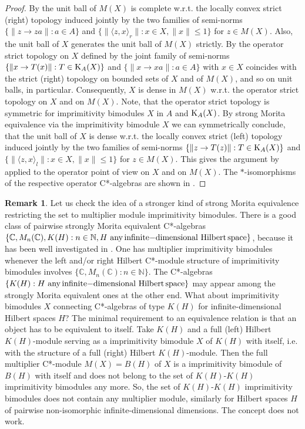 \documentclass{amsart}
\theoremstyle{definition}
\newtheorem{rmk}[thm]{Remark}
\begin{document}
\begin{proof}
By  \cite[Thm.~1.8, 1.9]{BG_2004} the unit ball of $M(X)$ is complete w.r.t. the locally convex strict (right) topology induced jointly by the two families of semi-norms $\{ \| z \to za \|: a \in A \}$ and $\{ \| \langle z,x \rangle_r \|: x \in X, \|x\| \leq 1 \}$ for $z \in M(X)$. Also, the unit ball of $X$ generates the unit ball of $M(X)$ strictly. By \cite[Def.~2, Remark 3]{B_2004} the operator strict topology on $X$ defined by the joint family of semi-norms $\{\| x \to T(x) \| :  T \in {\rm K}_A(X)\}$ and $\{ \|  x \to xa \|: a \in A \}$ with $x \in X$ coincides with the strict (right) topology on bounded sets of $X$ and of $M(X)$, and so on unit balls, in particular. Consequently, $X$ is dense in $M(X)$ w.r.t. the operator strict topology on $X$ and on $M(X)$. Note, that the operator strict topology is symmetric for imprimitivity bimodules $X$ in $A$ and ${\rm K}_A(X)$. 
By strong Morita equivalence via the imprimitivity bimodule $X$ we can symmetrically conclude, that the unit ball of $X$ is dense w.r.t. the locally convex strict (left) topology induced jointly by the two families of semi-norms $\{ \| z \to T(z) \|: T \in {\rm K}_A(X) \}$ and $\{ \| \langle z,x \rangle_l \|: x \in X, \|x\| \leq 1 \}$ for $z \in M(X)$. This gives the argument by \cite[Thm.~1.8, 1.9]{BG_2004} applied to the operator point of view on $X$ and on $M(X)$.
The $*$-isomorphisms of the respective operator C*-algebras are shown in \cite[Thm.~2.3]{BG_2004}.
\end{proof}

\begin{rmk}
Let us check the idea of a stronger kind of strong Morita equivalence restricting the set to multiplier module imprimitivity bimodules. There is a good class of pairwise strongly Morita equivalent C*-algebras $\{{\mathbb C}, M_n({\mathbb C}), K(H): n \in {\mathbb N}, H \,\, {\rm any} \, {\rm infinite{-}dimensional} \,\, {\rm Hilbert} \, {\rm space} \}$, because it has been well investigated in \cite{B_2004,BG_2004,Guljas_2021}. One has multiplier imprimitivity bimodules whenever the left and/or right Hilbert C*-module structure of imprimitivity bimodules involves  $\{{\mathbb C}, M_n({\mathbb C}):n \in {\mathbb N} \}$. The C*-algebras $\{ K(H):  H \,\, {\rm any} \, {\rm infinite{-}dimensional} \,\, {\rm Hilbert} \, {\rm space} \}$ may appear among the strongly Morita equivalent ones at the other end. What about imprimitivity bimodules $X$ connecting C*-algebras of type $K(H)$  for infinite-dimensional Hilbert spaces $H$? The minimal requirement to an equivalence relation is that an object has to be equivalent to itself. Take $K(H)$ and a full (left) Hilbert $K(H)$-module serving as a imprimitivity bimodule $X$ of $K(H)$ with itself, i.e. with the structure of a full (right) Hilbert $K(H)$-module. Then the full multiplier C*-module $M(X)=B(H)$ of $X$ is a imprimitivity bimodule of $B(H)$ with itself and does not belong to the set of $K(H)$-$K(H)$ imprimitivity bimodules any more. So, the set of $K(H)$-$K(H)$ imprimitivity bimodules does not contain any multiplier module, similarly for Hilbert spaces $H$ of pairwise non-isomorphic infinite-dimensional dimensions. The concept does not work.
\end{rmk}
\end{document}
